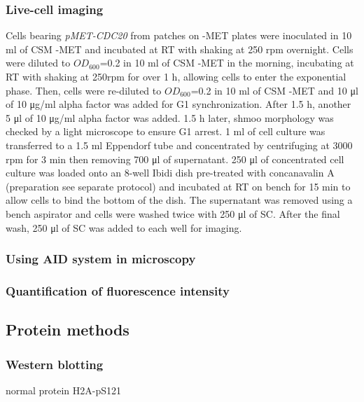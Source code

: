 \subsubsection{Live-cell imaging}
Cells bearing \textit{pMET-CDC20} from patches on -MET plates were inoculated in 10 \si{\milli\litre} of CSM -MET and incubated at RT with shaking at 250 rpm overnight. Cells were diluted to $OD_{600}$=0.2 in 10 \si{\milli\litre} of CSM -MET in the morning, incubating at RT with shaking at 250rpm for over 1 \si{\hour}, allowing cells to enter the exponential phase. Then, cells were re-diluted to $OD_{600}$=0.2 in 10 \si{\milli\litre} of CSM -MET and 10 \si{\micro\litre} of 10 \si{\micro\gram/\milli\litre} alpha factor was added for G1 synchronization. After 1.5 \si{\hour}, another 5 \si{\micro\litre} of 10 \si{\micro\gram/\milli\litre} alpha factor was added. 1.5 \si{\hour} later, shmoo morphology was checked by a light microscope to ensure G1 arrest. 1 \si{\milli\litre} of cell culture was transferred to a 1.5 \si{\milli\litre} Eppendorf tube and concentrated by centrifuging at 3000 rpm for 3 \si{\minute} then removing 700 \si{\micro\litre} of supernatant. 250 \si{\micro\litre} of concentrated cell culture was loaded onto an 8-well Ibidi dish pre-treated with concanavalin A (preparation see separate protocol) and incubated at RT on bench for 15 \si{\minute} to allow cells to bind the bottom of the dish. The supernatant was removed using a bench aspirator and cells were washed twice with 250 \si{\micro\litre} of SC. After the final wash, 250 \si{\micro\litre} of SC was added to each well for imaging. 


\subsubsection{Using AID system in microscopy}

\subsubsection{Quantification of fluorescence intensity}


\subsection{Protein methods}
\subsubsection{Western blotting}
normal protein
H2A-pS121
